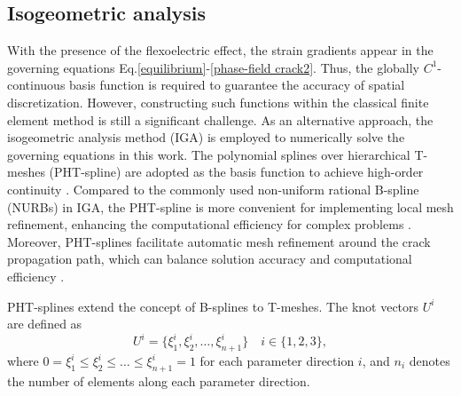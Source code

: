\documentclass[times,fleqn,11pt]{elsarticle}
\begin{document}
\subsection{Isogeometric analysis}
With the presence of the flexoelectric effect, the strain gradients appear in the governing equations Eq.\eqref{equilibrium}-\eqref{phase-field crack2}. Thus, the globally $C^1$-continuous basis function is required to guarantee the accuracy of spatial discretization. However, constructing such functions within the classical finite element method is still a significant challenge. As an alternative approach, the isogeometric analysis method (IGA) is employed to numerically solve the governing equations in this work. The polynomial splines over hierarchical T-meshes (PHT-spline) are adopted as the basis function to achieve high-order continuity \cite{deng_polynomial_2008}. Compared to the commonly used non-uniform rational B-spline (NURBs) in IGA, the PHT-spline is more convenient for implementing local mesh refinement, enhancing the computational efficiency for complex problems \cite{anitescu_recovery-based_2018}. Moreover, PHT-splines facilitate automatic mesh refinement around the crack propagation path, which can balance solution accuracy and computational efficiency \cite{goswami_adaptive_2020}.

PHT-splines extend the concept of B-splines to T-meshes. The knot vectors $U^i$ are defined as 
\begin{equation}
    U^i=\{\xi_1^i, \xi_2^i, \ldots, \xi_{n+1}^i\} \quad i\in\{1,2,3\},
\end{equation}
where $0=\xi_1^i\leq\xi_2^i\leq \ldots \leq\xi_{n+1}^i=1$ for each parameter direction $i$, and $n_i$ denotes the number of elements along each parameter direction.
\end{document}
